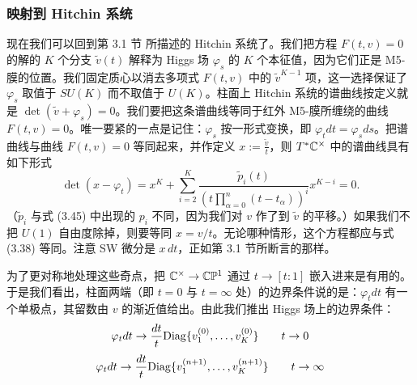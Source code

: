 
\subsubsection{映射到 Hitchin 系统}\label{subsubsec:MapToHitchin}

现在我们可以回到第 3.1 节%
所描述的 Hitchin 系统了。我们把方程 $F(t,v)=0$ 的解的 $K$ 个分支 $\tilde v(t)$ 解释为 Higgs 场 $\varphi_s$ 的 $K$ 个本征值，因为它们正是 M5-膜的位置。我们固定质心以消去多项式 $F(t,v)$ 中的 $\tilde v^{K-1}$ 项，这一选择保证了 $\varphi_s$ 取值于 $SU(K)$ 而不取值于 $U(K)$。柱面上 Hitchin 系统的谱曲线按定义就是 $\det (\tilde v + \varphi_s) =0$。我们要把这条谱曲线等同于红外 M5-膜所缠绕的曲线 $F(t,v)=0$。唯一要紧的一点是记住：$\varphi_s$ 按一形式变换，即 $\varphi_t dt= \varphi_s ds$。把谱曲线与曲线 $F(t,v)=0$ 等同起来，并作定义 $x := \frac{\tilde v}{t}$，则 $T^* \mathbb{C}^\times$ 中的谱曲线具有如下形式
\begin{equation}\label{eq:MatchHitchin}
\det (x-\varphi_t) = x^K + \sum_{i=2}^{K} \frac{\tilde p_i(t)}{ \left( t \prod_{\alpha=0}^{n} (t-t_\alpha) \right)^i } x^{K-i} = 0.
\end{equation}
（$\tilde p_i$ 与式 (3.45)%
中出现的 $p_i$ 不同，因为我们对 $v$ 作了到 $\tilde v$ 的平移。）如果我们不把 $U(1)$ 自由度除掉，则要等同 $x=v/t$。无论哪种情形，这个方程都应与式 (3.38)%
等同。注意 SW 微分是 $x\,dt$，正如第 3.1 节所断言的那样。

为了更对称地处理这些奇点，把 $\mathbb{C}^\times \to \mathbb{C} \mathbb{P}^1$ 通过 $t \to [t:1]$ 嵌入进来是有用的。于是我们看出，柱面两端（即 $t=0$ 与 $t=\infty$ 处）的边界条件说的是：$\varphi_t dt$ 有一个单极点，其留数由 $v$ 的渐近值给出。由此我们推出 Higgs 场上的边界条件：
\begin{equation}\label{eq:SimpleAtZero}
\varphi_t dt  \to \frac{dt}{t} {\rm Diag}\{v^{(0)}_1, \dots, v^{(0)}_K
\}\qquad t\to 0
\end{equation}
\begin{equation}\label{eq:SimpleAtInfty}
\varphi_t dt  \to \frac{dt}{t} {\rm Diag}\{v^{(n+1)}_1, \dots, v^{(n+1)}_K
\}\qquad t \to \infty
\end{equation}

